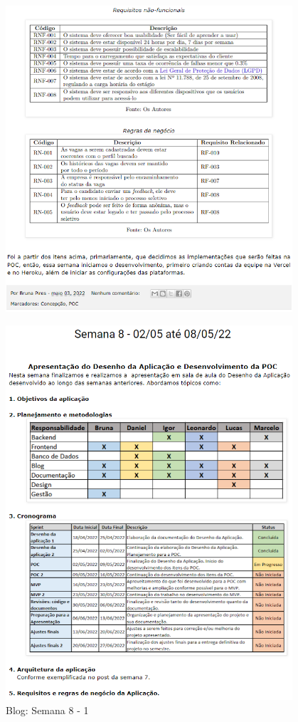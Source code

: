 \begin{apendicesenv}
\begin{figure}[H]
	\includegraphics[width=0.95\textwidth]{../imagens/blog-posts/semana07-3.png}
\end{figure}
\begin{figure}[H]
	\centering
	\caption{Blog: Semana 8 - 1}
	\includegraphics[width=0.95\textwidth]{../imagens/blog-posts/semana08-1.png}

\end{figure}
\end{apendicesenv}
